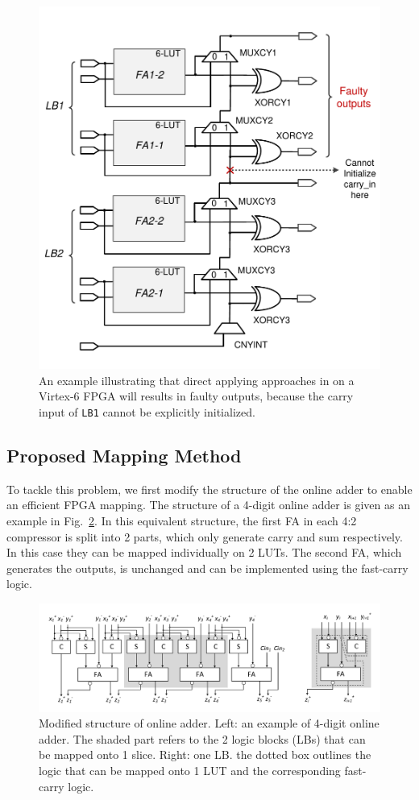 \documentclass[conference]{IEEEtran}
\begin{document}
\begin{figure}[tbp]
	\centering
	\includegraphics[width=.45\textwidth]{./Figures/SDadder_FastCarry_PreviousWork.pdf}
	\caption{An example illustrating that direct applying approaches in \cite{FPT09RA} on a Virtex-6 FPGA will results in faulty outputs, because the carry input of \texttt{LB1} cannot be explicitly initialized.}
	\label{Fig:PreWorkVirtex6}
\end{figure}

\subsection{Proposed Mapping Method}
To tackle this problem, we first modify the structure of the online adder to enable an efficient FPGA mapping. The structure of a 4-digit online adder is given as an example in Fig.~\ref{Fig:ModifiedOA}. In this equivalent structure, the first FA in each 4:2 compressor is split into 2 parts, which only generate carry and sum respectively. In this case they can be mapped individually on 2 LUTs. The second FA, which generates the outputs, is unchanged and can be implemented using the fast-carry logic.



\begin{figure}[tbp]
	\centering
	\includegraphics[width=.85\textwidth]{./Figures/SDadder_FPGA_New_4digit.pdf}
	\caption{Modified structure of online adder. Left: an example of 4-digit online adder. The shaded part refers to the 2 logic blocks (LBs) that can be mapped onto 1 slice. Right: one LB. the dotted box outlines the logic that can be mapped onto 1 LUT and the corresponding fast-carry logic.}
	\label{Fig:ModifiedOA}
\end{figure}
\end{document}
